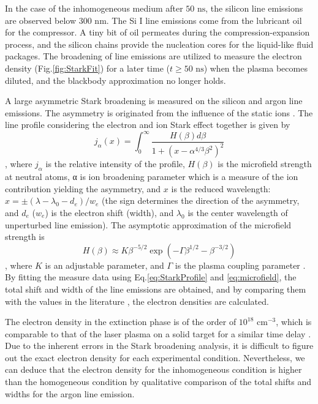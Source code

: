 In the case of the inhomogeneous medium after $50 \text{ ns}$, the silicon line emissions are observed below $300 \text{ nm}$. The Si I line emissions come from the lubricant oil for the compressor. A tiny bit of oil permeates during the compression-expansion process, and the silicon chains provide the nucleation cores for the liquid-like fluid packages. The broadening of line emissions are utilized to measure the electron density (Fig.\ref{fig:StarkFit}) for a later time ($t\geq50 \text{ ns}$) when the plasma becomes diluted, and the blackbody approximation no longer holds.

A large asymmetric Stark broadening is measured on the silicon and argon line emissions. The asymmetry is originated from the influence of the static ions \cite{bengoechea2005asymmetric}. The line profile considering the electron and ion Stark effect together is given by \cite{griem2012spectral, bengoechea2005asymmetric}
\begin{equation}
j_{\alpha} \left( x \right) = \int_{0}^{\infty} \frac{H \left( \beta \right) d \beta}{1+\left( x-\alpha^{4 / 3} \beta^{2} \right)^{2}}
\label{eq:StarkProfile}
\end{equation}
, where $j_\alpha$ is the relative intensity of the profile, $H \left( \beta \right)$ is the microfield strength at neutral atoms, α is ion broadening parameter which is a measure of the ion contribution yielding the asymmetry, and $x$ is the reduced wavelength: $x=\pm \left( \lambda - \lambda_0 - d_e \right) / w_e$ (the sign determines the direction of the asymmetry, and $d_e$ ($w_e$) is the electron shift (width), and $\lambda_0$ is the center wavelength of unperturbed line emission). The asymptotic approximation of the microfield strength is 
\begin{equation}
H \left( \beta \right) \approx K \beta^{-5 / 2} \exp \left( -\Gamma \beta^{1 / 2}-\beta^{-3 / 2} \right)
\label{eq:microfield}
\end{equation}
, where $K$ is an adjustable parameter, and $\Gamma$ is the plasma coupling parameter \cite{potekhin2002electric}. By fitting the measure data using Eq.\ref{eq:StarkProfile} and \ref{eq:microfield}, the total shift and width of the line emissions are obtained, and by comparing them with the values in the literature \cite{konjevic2002experimental}, the electron densities are calculated.

The electron density in the extinction phase is of the order of $10^{18}  \text{ cm}^{-3}$, which is comparable to that of the laser plasma on a solid target for a similar time delay \cite{ivkovic2017stark}. Due to the inherent errors in the Stark broadening analysis, it is difficult to figure out the exact electron density for each experimental condition. Nevertheless, we can deduce that the electron density for the inhomogeneous condition is higher than the homogeneous condition by qualitative comparison of the total shifts and widths for the argon line emission.



